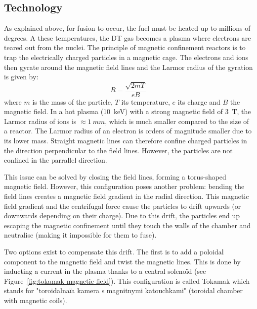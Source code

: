 \subsection{Technology \cite{mccracken_fusion_2013}}
As explained above, for fusion to occur, the fuel must be heated up to millions of degrees.
A these temperatures, the DT gas becomes a plasma where electrons are teared out from the nuclei.
The principle of magnetic confinement reactors is to trap the electrically charged particles in a magnetic cage.
The electrons and ions then gyrate around the magnetic field lines and the Larmor radius of the gyration is given by:
\begin{equation}
    R =  \frac{\sqrt{2 m T}}{e B}
\end{equation}
where $m$ is the mass of the particle, $T$ its temperature, $e$ its charge and $B$ the magnetic field.
In a hot plasma (\SI{10}{keV}) with a strong magnetic field of \SI{3}{T}, the Larmor radius of ions is $\approx \SI{1}{mm}$, which is much smaller compared to the size of a reactor.
The Larmor radius of an electron is orders of magnitude smaller due to its lower mass.
Straight magnetic lines can therefore confine charged particles in the direction perpendicular to the field lines.
However, the particles are not confined in the parrallel direction.

This issue can be solved by closing the field lines, forming a torus-shaped magnetic field.
However, this configuration poses another problem: bending the field lines creates a magnetic field gradient in the radial direction.
This magnetic field gradient and the centrifugal force cause the particles to drift upwards (or downwards depending on their charge).
Due to this drift, the particles end up escaping the magnetic confinement until they touch the walls of the chamber and neutralise (making it impossible for them to fuse).

Two options exist to compensate this drift.
The first is to add a poloidal component to the magnetic field and twist the magnetic lines.
This is done by inducting a current in the plasma thanks to a central solenoïd (see Figure~\ref{fig:tokamak magnetic field}).
This configuration is called Tokamak which stands for "toroidalnaïa kamera s magnitnymi katouchkami" (toroidal chamber with magnetic coils).

